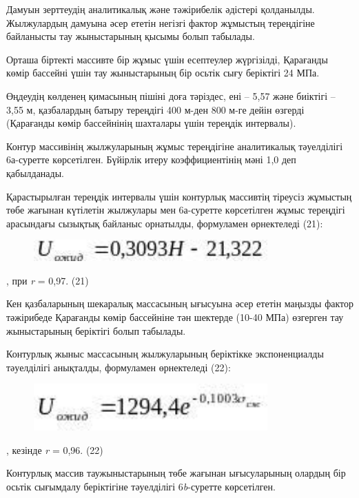 Дамуын зерттеудің аналитикалық және тәжірибелік әдістері қолданылды.
Жылжулардың дамуына әсер ететін негізгі фактор жұмыстың тереңдігіне
байланысты тау жыныстарының қысымы болып табылады.

Орташа біртекті массивте бір жұмыс үшін есептеулер жүргізілді, Қарағанды
көмір бассейні үшін тау жыныстарының бір осьтік сығу беріктігі 24 МПа.

Өңдеудің көлденең қимасының пішіні доға тәріздес, ені -- 5,57 және
биіктігі -- 3,55 м, қазбалардың батыру тереңдігі 400 м-ден 800 м-ге
дейін өзгерді (Қарағанды көмір бассейнінің шахталары үшін тереңдік
интервалы).

Контур массивінің жылжуларының жұмыс тереңдігіне аналитикалық
тәуелділігі 6а-суретте көрсетілген. Бүйірлік итеру коэффициентінің мәні
1,0 деп қабылданады.

Қарастырылған тереңдік интервалы үшін контурлық массивтің тіреусіз
жұмыстың төбе жағынан күтілетін жылжулары мен 6а-суретте көрсетілген
жұмыс тереңдігі арасындағы сызықтық байланыс орнатылды, формуламен
өрнектеледі (21):

\begin{figure}[H]
	\centering
	\includegraphics[width=0.8\textwidth]{assets/1335}
	\caption*{}
\end{figure}, при \emph{r} = 0,97. (21)

Кен қазбаларының шекаралық массасының ығысуына әсер ететін маңызды
фактор тәжірибеде Қарағанды көмір бассейніне тән шектерде (10-40 МПа)
өзгерген тау жыныстарының беріктігі болып табылады.

Контурлық жыныс массасының жылжуларының беріктікке экспоненциалды
тәуелділігі анықталды, формуламен өрнектеледі (22):

\begin{figure}[H]
	\centering
	\includegraphics[width=0.8\textwidth]{assets/1336}
	\caption*{}
\end{figure}, кезінде \emph{r} = 0,96. (22)

Контурлық массив таужыныстарының төбе жағынан ығысуларының олардың бір
осьтік сығымдалу беріктігіне тәуелділігі 6\emph{b}-суретте көрсетілген.

